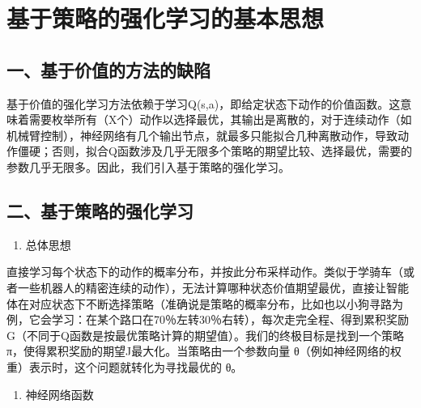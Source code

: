 \setcounter{section}{0}

\hypertarget{ux57faux4e8eux7b56ux7565ux7684ux5f3aux5316ux5b66ux4e60ux7684ux57faux672cux601dux60f3}{%
\section{基于策略的强化学习的基本思想}\label{ux57faux4e8eux7b56ux7565ux7684ux5f3aux5316ux5b66ux4e60ux7684ux57faux672cux601dux60f3}}

\hypertarget{ux4e00ux57faux4e8eux4ef7ux503cux7684ux65b9ux6cd5ux7684ux7f3aux9677}{%
\subsection{一、基于价值的方法的缺陷}\label{ux4e00ux57faux4e8eux4ef7ux503cux7684ux65b9ux6cd5ux7684ux7f3aux9677}}

基于价值的强化学习方法依赖于学习Q(s,a)，即给定状态下动作的价值函数。这意味着需要枚举所有（X个）动作以选择最优，其输出是离散的，对于连续动作（如机械臂控制），神经网络有几个输出节点，就最多只能拟合几种离散动作，导致动作僵硬；否则，拟合Q函数涉及几乎无限多个策略的期望比较、选择最优，需要的参数几乎无限多。因此，我们引入基于策略的强化学习。

\hypertarget{ux4e8cux57faux4e8eux7b56ux7565ux7684ux5f3aux5316ux5b66ux4e60}{%
\subsection{二、基于策略的强化学习}\label{ux4e8cux57faux4e8eux7b56ux7565ux7684ux5f3aux5316ux5b66ux4e60}}

\begin{enumerate}
\def\labelenumi{\arabic{enumi}.}
\tightlist
\item
  总体思想
\end{enumerate}

直接学习每个状态下的动作的概率分布，并按此分布采样动作。类似于学骑车（或者一些机器人的精密连续的动作），无法计算哪种状态价值期望最优，直接让智能体在对应状态下不断选择策略（准确说是策略的概率分布，比如也以小狗寻路为例，它会学习：在某个路口在70％左转30％右转），每次走完全程、得到累积奖励G（不同于Q函数是按最优策略计算的期望值）。我们的终极目标是找到一个策略π，使得累积奖励的期望J最大化。当策略由一个参数向量 θ（例如神经网络的权重）表示时，这个问题就转化为寻找最优的 θ。

\begin{enumerate}
\def\labelenumi{\arabic{enumi}.}
\setcounter{enumi}{1}
\tightlist
\item
  神经网络函数
\end{enumerate}

